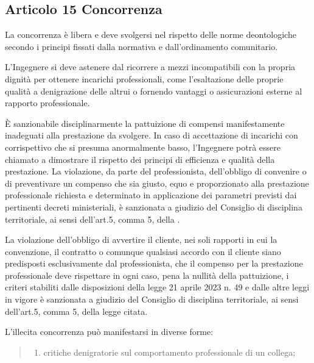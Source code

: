 \documentclass[letterpaper,10pt,italian]{sphinxmanual}
\begin{document}
\subsection{Articolo 15 \sphinxhyphen{} Concorrenza}
\label{\detokenize{capitoli/codice/codice_deontologico:articolo-15-concorrenza}}\begin{description}
\sphinxAtStartPar
La concorrenza è libera e deve svolgersi nel rispetto delle norme deontologiche secondo i principi fissati dalla normativa e dall’ordinamento comunitario.

\sphinxAtStartPar
L’Ingegnere si deve astenere dal ricorrere a mezzi incompatibili con la propria dignità per ottenere incarichi professionali, come l’esaltazione delle proprie qualità a denigrazione delle altrui o fornendo vantaggi o assicurazioni esterne al rapporto professionale.

\sphinxAtStartPar
È sanzionabile disciplinarmente la pattuizione di compensi manifestamente inadeguati alla prestazione da svolgere. In caso di accettazione di incarichi con corrispettivo che si presuma anormalmente basso, l’Ingegnere potrà essere chiamato a dimostrare il rispetto dei principi di efficienza e qualità della prestazione. La violazione, da parte del professionista, dell’obbligo di convenire o di preventivare un compenso che sia giusto, equo e proporzionato alla prestazione professionale richiesta e determinato in applicazione dei parametri previsti dai pertinenti decreti ministeriali, è sanzionata a giudizio del Consiglio di disciplina territoriale, ai sensi dell’art.5, comma 5, della .

\sphinxAtStartPar
La violazione dell’obbligo di avvertire il cliente, nei soli rapporti in cui la convenzione, il contratto o comunque qualsiasi accordo con il cliente siano predisposti esclusivamente dal professionista, che il compenso per la prestazione professionale deve rispettare in ogni caso, pena la nullità della pattuizione, i criteri stabiliti dalle disposizioni della legge 21 aprile 2023 n. 49 e dalle altre leggi in vigore è sanzionata a giudizio del Consiglio di disciplina territoriale, ai sensi dell’art.5, comma 5, della legge citata.

\sphinxAtStartPar
L’illecita concorrenza può manifestarsi in diverse forme:
\begin{quote}
\begin{enumerate}
%
\item {} 
\sphinxAtStartPar
critiche denigratorie sul comportamento professionale di un collega;


\end{enumerate}
\end{quote}
\end{description}
\end{document}
